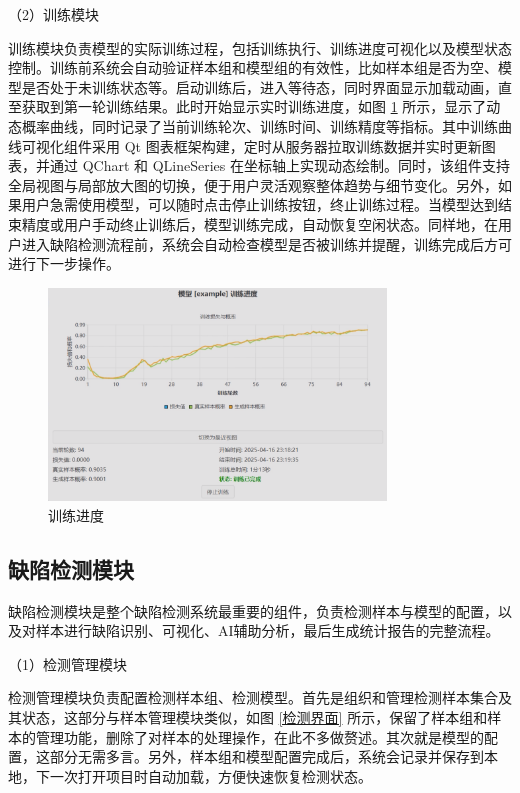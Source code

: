 \documentclass[
  ]{njuthesis}
\begin{document}
（2）训练模块

训练模块负责模型的实际训练过程，包括训练执行、训练进度可视化以及模型状态控制。训练前系统会自动验证样本组和模型组的有效性，比如样本组是否为空、模型是否处于未训练状态等。启动训练后，进入等待态，同时界面显示加载动画，直至获取到第一轮训练结果。此时开始显示实时训练进度，如图 \ref{训练进度} 所示，显示了动态概率曲线，同时记录了当前训练轮次、训练时间、训练精度等指标。其中训练曲线可视化组件采用 Qt 图表框架构建，定时从服务器拉取训练数据并实时更新图表，并通过 QChart 和 QLineSeries 在坐标轴上实现动态绘制。同时，该组件支持全局视图与局部放大图的切换，便于用户灵活观察整体趋势与细节变化。另外，如果用户急需使用模型，可以随时点击停止训练按钮，终止训练过程。当模型达到结束精度或用户手动终止训练后，模型训练完成，自动恢复空闲状态。同样地，在用户进入缺陷检测流程前，系统会自动检查模型是否被训练并提醒，训练完成后方可进行下一步操作。

\begin{figure}[htb]
    \centering
    \includegraphics[width=0.80\textwidth]{images/训练进度.png}
    \caption{训练进度}
    \label{训练进度}
\end{figure}

\subsection{缺陷检测模块}

缺陷检测模块是整个缺陷检测系统最重要的组件，负责检测样本与模型的配置，以及对样本进行缺陷识别、可视化、AI辅助分析，最后生成统计报告的完整流程。

（1）检测管理模块

检测管理模块负责配置检测样本组、检测模型。首先是组织和管理检测样本集合及其状态，这部分与样本管理模块类似，如图 \ref{检测界面} 所示，保留了样本组和样本的管理功能，删除了对样本的处理操作，在此不多做赘述。其次就是模型的配置，这部分无需多言。另外，样本组和模型配置完成后，系统会记录并保存到本地，下一次打开项目时自动加载，方便快速恢复检测状态。
\end{document}
